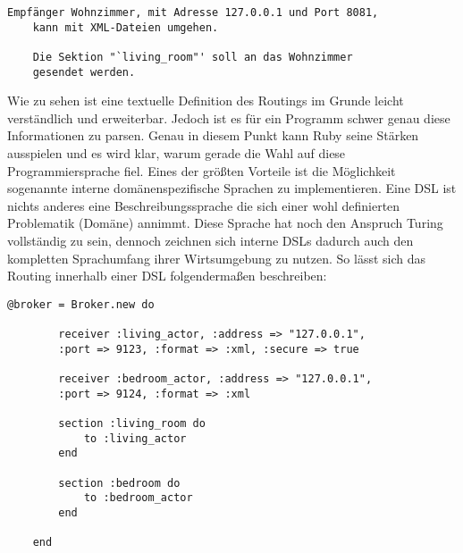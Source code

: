 \lstset{language=bash}
\begin{lstlisting}[caption=Beschreibung des Routings als Pseudocode, captionpos=b]
	Empfänger Wohnzimmer, mit Adresse 127.0.0.1 und Port 8081, 
	kann mit XML-Dateien umgehen.

	Die Sektion "`living_room"' soll an das Wohnzimmer 
	gesendet werden.

\end{lstlisting}

Wie zu sehen ist eine textuelle Definition des Routings im Grunde leicht verständlich und erweiterbar. Jedoch ist es für ein Programm schwer genau diese Informationen zu parsen. Genau in diesem Punkt kann Ruby seine Stärken ausspielen und es wird klar, warum gerade die Wahl auf diese Programmiersprache fiel. Eines der größten Vorteile ist die Möglichkeit sogenannte interne domänenspezifische Sprachen zu implementieren. Eine DSL ist nichts anderes eine Beschreibungssprache die sich einer wohl definierten Problematik (Domäne) annimmt. Diese Sprache hat noch den Anspruch Turing vollständig zu sein, dennoch zeichnen sich interne DSLs dadurch auch den kompletten Sprachumfang ihrer Wirtsumgebung zu nutzen. So lässt sich das Routing innerhalb einer DSL folgendermaßen beschreiben: 

\lstset{language=Ruby}
\begin{lstlisting}[caption= Interne Routing-DSL des Brain, captionpos=b]
	@broker = Broker.new do 

		receiver :living_actor, :address => "127.0.0.1", 
		:port => 9123, :format => :xml, :secure => true
		
		receiver :bedroom_actor, :address => "127.0.0.1", 
		:port => 9124, :format => :xml
		
		section :living_room do
			to :living_actor
		end

		section :bedroom do
			to :bedroom_actor
		end

	end
\end{lstlisting}

